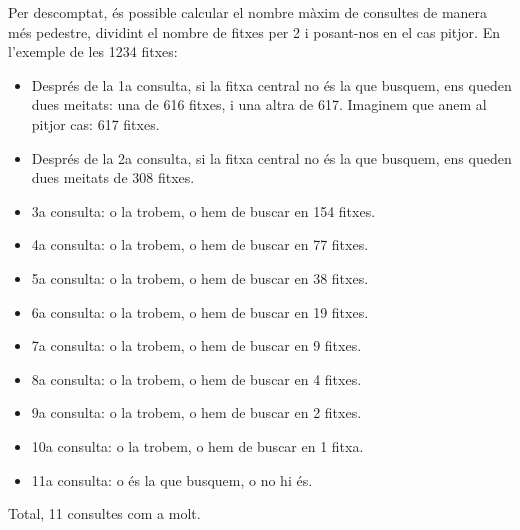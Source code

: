 Per descomptat, és possible calcular el nombre màxim de consultes de
manera més pedestre, dividint el nombre de fitxes per 2 i posant-nos
en el cas pitjor. En l'exemple de les 1234 fitxes:
\begin{itemize}
\item Després de la 1a consulta, si la fitxa central no és la que
  busquem, ens queden dues meitats: una de 616 fitxes, i una altra de
  617. Imaginem que anem al pitjor cas: 617 fitxes.
\item Després de la 2a consulta, si la fitxa central no és la que
  busquem, ens queden dues meitats de 308 fitxes.
\item 3a consulta: o la trobem, o hem de buscar en 154 fitxes.
\item 4a consulta: o la trobem, o hem de buscar en 77 fitxes.
\item 5a consulta: o la trobem, o hem de buscar en 38 fitxes.
\item 6a consulta: o la trobem, o hem de buscar en 19 fitxes.
\item 7a consulta: o la trobem, o hem de buscar en 9 fitxes.
\item 8a consulta: o la trobem, o hem de buscar en 4 fitxes.
\item 9a consulta: o la trobem, o hem de buscar en 2 fitxes.
\item 10a consulta: o la trobem, o hem de buscar en 1 fitxa.
\item 11a consulta: o és la que busquem, o no hi és.
\end{itemize}
Total, 11 consultes com a molt.

